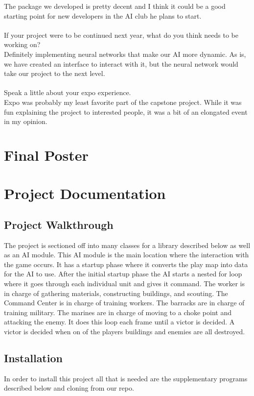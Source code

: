 \documentclass[10pt,letterpaper,onecolumn,draftclsnofoot]{IEEEtran}
\begin{document}
The package we developed is pretty decent and I think it could be a good starting point for new developers in the AI club he plans to start.\\
\\
If your project were to be continued next year, what do you think needs to be working on?\\
Definitely implementing neural networks that make our AI more dynamic. As is, we have created an interface to interact with it, but the neural network would take our project to the next level.\\
\\
Speak a little about your expo experience.\\
Expo was probably my least favorite part of the capstone project. While it was fun explaining the project to interested people, it was a bit of an elongated event in my opinion.
\section{Final Poster}

\newpage

\section{Project Documentation}
\subsection{Project Walkthrough}
The project is sectioned off into many classes for a library described below as well as an AI module. This AI module is the main location where the interaction with the game occurs. It has a startup phase where it converts the play map into data for the AI to use. After the initial startup phase the AI starts a nested for loop where it goes through each individual unit and gives it command. The worker is in charge of gathering materials, constructing buildings, and scouting. The Command Center is in charge of training workers. The barracks are in charge of training military. The marines are in charge of moving to a choke point and attacking the enemy. It does this loop each frame until a victor is decided. A victor is decided when on of the players buildings and enemies are all destroyed.
\subsection{Installation}
In order to install this project all that is needed are the supplementary programs described below and cloning from our repo.
\end{document}
